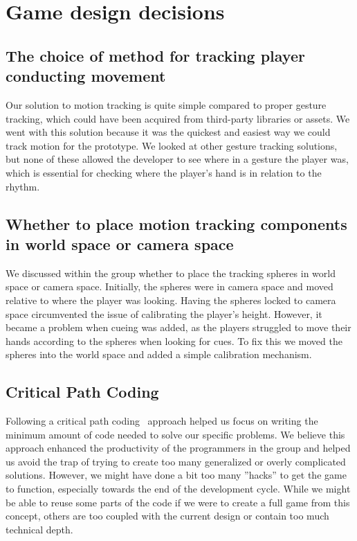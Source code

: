 \section{Game design decisions}
\subsection{The choice of method for tracking player conducting movement}
Our solution to motion tracking is quite simple compared to proper gesture tracking, which could have been acquired from third-party libraries or assets. We went with this solution because it was the quickest and easiest way we could track motion for the prototype. We looked at other gesture tracking solutions, but none of these allowed the developer to see where in a gesture the player was, which is essential for checking where the player’s hand is in relation to the rhythm. 

\subsection{Whether to place motion tracking components in world space or camera space}
We discussed within the group whether to place the tracking spheres in world space or camera space. Initially, the spheres were in camera space and moved relative to where the player was looking. Having the spheres locked to camera space circumvented the issue of calibrating the player's height. However, it became a problem when cueing was added, as the players struggled to move their hands according to the spheres when looking for cues.
To fix this we moved the spheres into the world space and added a simple calibration mechanism.

\subsection{Critical Path Coding}
Following a critical path coding~\cite{critical_path_coding} approach helped us focus on writing the minimum amount of code needed to solve our specific problems. We believe this approach enhanced the productivity of the programmers in the group and helped us avoid the trap of trying to create too many generalized or overly complicated solutions. However, we might have done a bit too many ''hacks'' to get the game to function, especially towards the end of the development cycle. While we might be able to reuse some parts of the code if we were to create a full game from this concept, others are too coupled with the current design or contain too much technical depth.

